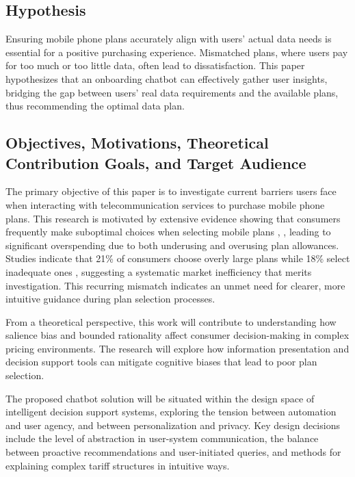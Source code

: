 \documentclass[conference]{IEEEtran}
\begin{document}
\subsection{Hypothesis}

Ensuring mobile phone plans accurately align with users' actual data needs is essential for a positive purchasing experience. Mismatched plans, where users pay for too much or too little data, often lead to dissatisfaction. This paper hypothesizes that an onboarding chatbot can effectively gather user insights, bridging the gap between users' real data requirements and the available plans, thus recommending the optimal data plan.

\subsection{Objectives, Motivations, Theoretical Contribution Goals, and Target Audience}

The primary objective of this paper is to investigate current barriers users face when interacting with telecommunication services to purchase mobile phone plans. This research is motivated by extensive evidence showing that consumers frequently make suboptimal choices when selecting mobile plans \cite{b3}, \cite{b1}, leading to significant overspending due to both underusing and overusing plan allowances. Studies indicate that 21\% of consumers choose overly large plans while 18\% select inadequate ones \cite{b3}, suggesting a systematic market inefficiency that merits investigation. This recurring mismatch indicates an unmet need for clearer, more intuitive guidance during plan selection processes.

From a theoretical perspective, this work will contribute to understanding how salience bias \cite{b3} and bounded rationality \cite{b1} affect consumer decision-making in complex pricing environments. The research will explore how information presentation and decision support tools can mitigate cognitive biases that lead to poor plan selection.

The proposed chatbot solution will be situated within the design space of intelligent decision support systems, exploring the tension between automation and user agency, and between personalization and privacy. Key design decisions include the level of abstraction in user-system communication, the balance between proactive recommendations and user-initiated queries, and methods for explaining complex tariff structures in intuitive ways.
\end{document}

